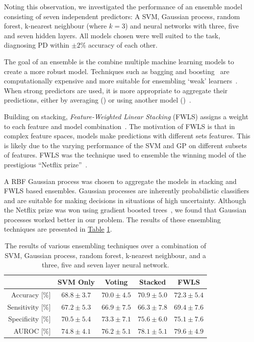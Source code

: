 \documentclass[12pt, twoside]{book}
\renewcommand\emph[1]{\textit{\color{USred}{#1}}}
\begin{document}
Noting this observation, we investigated the performance of an ensemble model consisting of seven independent predictors: A SVM, Gaussian process, random forest, k-nearest neighbour (where $k=3$) and neural networks with three, five and seven hidden layers. All models chosen were well suited to the task, diagnosing PD within $\pm2\%$ accuracy of each other.

The goal of an ensemble is the combine multiple machine learning models to create a more robust model. Techniques such as bagging and boosting~\cite{adaboost} are computationally expensive and more suitable for ensembling `weak' learners~\cite{ensembleml}. When strong predictors are used, it is more appropriate to aggregate their predictions, either by averaging (\emph{voting}) or using another model (\emph{stacking})~\cite{stackregression}.

Building on stacking, \textit{Feature-Weighted Linear Stacking} (FWLS) assigns a weight to each feature and model combination~\cite{fwls}. The motivation of FWLS is that in complex feature spaces, models make predictions with different sets features. This is likely due to the varying performance of the SVM and GP on different subsets of features. FWLS was the technique used to ensemble the winning model of the prestigious ``Netflix prize''~\cite{netflixprizebellkor}.


A RBF Gaussian process was chosen to aggregate the models in stacking and FWLS based ensembles. Gaussian processes are inherently probabilistic classifiers and are suitable for making decisions in situations of high uncertainty. Although the Netflix prize was won using gradient boosted trees~\cite{gradientboosting}, we found that Gaussian processes worked better in our problem. The results of these ensembling techniques are presented in \hyperref[ensembles]{Table} \ref{ensembles}.


\begin{table}[h]
	\caption{The results of various ensembling techniques over a combination of SVM, Gaussian process, random forest, k-nearest neighbour, and a three, five and seven layer neural network.}
	\label{ensembles}
	\centering
	\begin{tabular}{@{}rcccc@{}}
		&  SVM Only & Voting & Stacked & FWLS \\ \midrule
		Accuracy [\%]    &  $68.8\pm3.7$ & $70.0\pm4.5$ &$70.9\pm5.0$&$72.3\pm5.4$\\ \midrule
		Sensitivity [\%] &  $67.2\pm5.3$ & $66.9\pm7.5$ &$66.3\pm7.8$& $69.4\pm7.6$\\ \midrule
		Specificity [\%] &  $70.5\pm5.4$ & $73.3\pm7.1$ &$75.6\pm6.0$& $75.1\pm7.6$\\ \midrule
		AUROC [\%]       &  $74.8\pm4.1$ & $76.2\pm5.1$ &$78.1\pm5.1$ & $79.6\pm4.9$ \\ \midrule
	\end{tabular}
\end{table}
\end{document}
